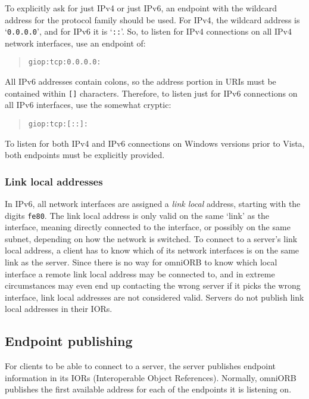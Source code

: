 \documentclass[11pt,oneside,a4paper]{book}
\newcommand{\code}[1]{\texttt{#1}}
\newcommand{\term}[1]{\textit{#1}}
\begin{document}
To explicitly ask for just IPv4 or just IPv6, an endpoint with the
wildcard address for the protocol family should be used. For IPv4, the
wildcard address is `\code{0.0.0.0}', and for IPv6 it is `\code{::}'.
So, to listen for IPv4 connections on all IPv4 network interfaces, use
an endpoint of:

\begin{quote}
\code{giop:tcp:0.0.0.0:}
\end{quote}

\noindent All IPv6 addresses contain colons, so the address portion in
URIs must be contained within \code{[]} characters. Therefore, to
listen just for IPv6 connections on all IPv6 interfaces, use the
somewhat cryptic:

\begin{quote}
\code{giop:tcp:[::]:}
\end{quote}

\noindent To listen for both IPv4 and IPv6 connections on Windows
versions prior to Vista, both endpoints must be explicitly provided.

\subsubsection{Link local addresses}

In IPv6, all network interfaces are assigned a \term{link local}
address, starting with the digits \code{fe80}. The link local address
is only valid on the same `link' as the interface, meaning directly
connected to the interface, or possibly on the same subnet, depending
on how the network is switched. To connect to a server's link local
address, a client has to know which of its network interfaces is on
the same link as the server. Since there is no way for omniORB to know
which local interface a remote link local address may be connected to,
and in extreme circumstances may even end up contacting the wrong
server if it picks the wrong interface, link local addresses are not
considered valid. Servers do not publish link local addresses in their
IORs.


\subsection{Endpoint publishing}

For clients to be able to connect to a server, the server publishes
endpoint information in its IORs (Interoperable Object References).
Normally, omniORB publishes the first available address for each of
the endpoints it is listening on.
\end{document}
